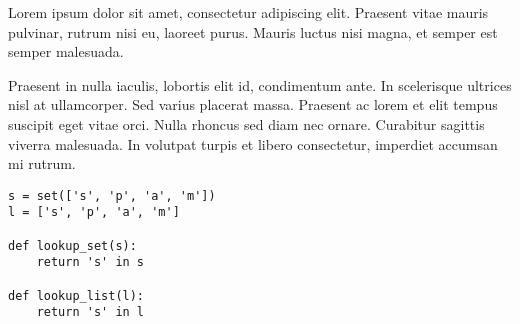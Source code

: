 Lorem ipsum dolor sit amet, consectetur adipiscing elit. Praesent vitae mauris
pulvinar, rutrum nisi eu, laoreet purus. Mauris luctus nisi magna, et semper
est semper malesuada.

Praesent in nulla iaculis, lobortis elit id, condimentum
ante. In scelerisque ultrices nisl at ullamcorper. Sed varius placerat massa.
Praesent ac lorem et elit tempus suscipit eget vitae orci. Nulla rhoncus sed
diam nec ornare. Curabitur sagittis viverra malesuada. In volutpat turpis et
libero consectetur, imperdiet accumsan mi rutrum.

\begin{verbatim}
s = set(['s', 'p', 'a', 'm'])
l = ['s', 'p', 'a', 'm']

def lookup_set(s):
    return 's' in s

def lookup_list(l):
    return 's' in l
\end{verbatim}
